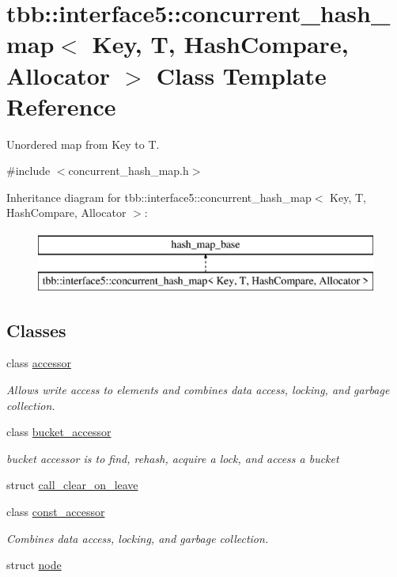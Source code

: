 \hypertarget{classtbb_1_1interface5_1_1concurrent__hash__map}{}\section{tbb\+:\+:interface5\+:\+:concurrent\+\_\+hash\+\_\+map$<$ Key, T, Hash\+Compare, Allocator $>$ Class Template Reference}
\label{classtbb_1_1interface5_1_1concurrent__hash__map}


Unordered map from Key to T.  




{\ttfamily \#include $<$concurrent\+\_\+hash\+\_\+map.\+h$>$}

Inheritance diagram for tbb\+:\+:interface5\+:\+:concurrent\+\_\+hash\+\_\+map$<$ Key, T, Hash\+Compare, Allocator $>$\+:\begin{figure}[H]
\begin{center}
\leavevmode
\includegraphics[height=2.000000cm]{classtbb_1_1interface5_1_1concurrent__hash__map}
\end{center}
\end{figure}
\subsection*{Classes}
\begin{DoxyCompactItemize}
\item 
class \hyperlink{classtbb_1_1interface5_1_1concurrent__hash__map_1_1accessor}{accessor}
\begin{DoxyCompactList}\small\item\em Allows write access to elements and combines data access, locking, and garbage collection. \end{DoxyCompactList}\item 
class \hyperlink{classtbb_1_1interface5_1_1concurrent__hash__map_1_1bucket__accessor}{bucket\+\_\+accessor}
\begin{DoxyCompactList}\small\item\em bucket accessor is to find, rehash, acquire a lock, and access a bucket \end{DoxyCompactList}\item 
struct \hyperlink{structtbb_1_1interface5_1_1concurrent__hash__map_1_1call__clear__on__leave}{call\+\_\+clear\+\_\+on\+\_\+leave}
\item 
class \hyperlink{classtbb_1_1interface5_1_1concurrent__hash__map_1_1const__accessor}{const\+\_\+accessor}
\begin{DoxyCompactList}\small\item\em Combines data access, locking, and garbage collection. \end{DoxyCompactList}\item 
struct \hyperlink{structtbb_1_1interface5_1_1concurrent__hash__map_1_1node}{node}
\end{DoxyCompactItemize}
